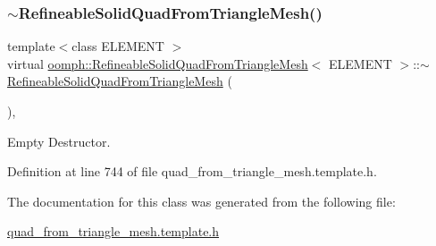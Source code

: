 \subsubsection{\texorpdfstring{$\sim$\+Refineable\+Solid\+Quad\+From\+Triangle\+Mesh()}{~RefineableSolidQuadFromTriangleMesh()}}
{\footnotesize\ttfamily template$<$class E\+L\+E\+M\+E\+NT $>$ \\
virtual \hyperlink{classoomph_1_1RefineableSolidQuadFromTriangleMesh}{oomph\+::\+Refineable\+Solid\+Quad\+From\+Triangle\+Mesh}$<$ E\+L\+E\+M\+E\+NT $>$\+::$\sim$\hyperlink{classoomph_1_1RefineableSolidQuadFromTriangleMesh}{Refineable\+Solid\+Quad\+From\+Triangle\+Mesh} (\begin{DoxyParamCaption}{ }\end{DoxyParamCaption})\hspace{0.3cm}{\ttfamily [inline]}, {\ttfamily [virtual]}}



Empty Destructor. 



Definition at line 744 of file quad\+\_\+from\+\_\+triangle\+\_\+mesh.\+template.\+h.



The documentation for this class was generated from the following file\+:\begin{DoxyCompactItemize}
\item 
\hyperlink{quad__from__triangle__mesh_8template_8h}{quad\+\_\+from\+\_\+triangle\+\_\+mesh.\+template.\+h}\end{DoxyCompactItemize}
